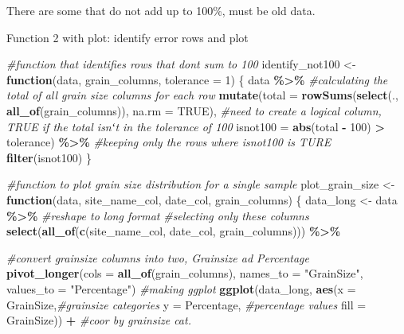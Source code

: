 \documentclass[
]{article}
\newenvironment{Shaded}{\begin{snugshade}}{\end{snugshade}}
\newcommand{\AttributeTok}[1]{\textcolor[rgb]{0.13,0.29,0.53}{#1}}
\newcommand{\CommentTok}[1]{\textcolor[rgb]{0.56,0.35,0.01}{\textit{#1}}}
\newcommand{\ConstantTok}[1]{\textcolor[rgb]{0.56,0.35,0.01}{#1}}
\newcommand{\ControlFlowTok}[1]{\textcolor[rgb]{0.13,0.29,0.53}{\textbf{#1}}}
\newcommand{\DecValTok}[1]{\textcolor[rgb]{0.00,0.00,0.81}{#1}}
\newcommand{\FunctionTok}[1]{\textcolor[rgb]{0.13,0.29,0.53}{\textbf{#1}}}
\newcommand{\NormalTok}[1]{#1}
\newcommand{\OtherTok}[1]{\textcolor[rgb]{0.56,0.35,0.01}{#1}}
\newcommand{\SpecialCharTok}[1]{\textcolor[rgb]{0.81,0.36,0.00}{\textbf{#1}}}
\newcommand{\StringTok}[1]{\textcolor[rgb]{0.31,0.60,0.02}{#1}}
\begin{document}
There are some that do not add up to 100\%, must be old data.

Function 2 with plot: identify error rows and plot

\begin{Shaded}
\begin{Highlighting}[]
\CommentTok{\#function that identifies rows that don\textquotesingle{}t sum to 100}
\NormalTok{identify\_not100 }\OtherTok{\textless{}{-}} \ControlFlowTok{function}\NormalTok{(data, grain\_columns, }\AttributeTok{tolerance =} \DecValTok{1}\NormalTok{) \{}
\NormalTok{  data }\SpecialCharTok{\%\textgreater{}\%}
    \CommentTok{\#calculating the total of all grain size columns for each row}
    \FunctionTok{mutate}\NormalTok{(}\AttributeTok{total =} \FunctionTok{rowSums}\NormalTok{(}\FunctionTok{select}\NormalTok{(., }\FunctionTok{all\_of}\NormalTok{(grain\_columns)), }\AttributeTok{na.rm =} \ConstantTok{TRUE}\NormalTok{),}
           \CommentTok{\#need to create a logical column, TRUE if the total isnʻt in the tolerance of 100}
           \AttributeTok{isnot100 =} \FunctionTok{abs}\NormalTok{(total }\SpecialCharTok{{-}} \DecValTok{100}\NormalTok{) }\SpecialCharTok{\textgreater{}}\NormalTok{ tolerance) }\SpecialCharTok{\%\textgreater{}\%}
    \CommentTok{\#keeping only the rows where isnot100 is TURE}
    \FunctionTok{filter}\NormalTok{(isnot100)}
\NormalTok{\}}

\CommentTok{\#function to plot grain size distribution for a single sample}
\NormalTok{plot\_grain\_size }\OtherTok{\textless{}{-}} \ControlFlowTok{function}\NormalTok{(data, site\_name\_col, date\_col, grain\_columns) \{}
\NormalTok{  data\_long }\OtherTok{\textless{}{-}}\NormalTok{ data }\SpecialCharTok{\%\textgreater{}\%}
    \CommentTok{\#reshape to long format }
    \CommentTok{\#selecting only these columns}
    \FunctionTok{select}\NormalTok{(}\FunctionTok{all\_of}\NormalTok{(}\FunctionTok{c}\NormalTok{(site\_name\_col, date\_col, grain\_columns))) }\SpecialCharTok{\%\textgreater{}\%}
   
    \CommentTok{\#convert grainsize columns into two, Grainsize ad Percentage}
     \FunctionTok{pivot\_longer}\NormalTok{(}\AttributeTok{cols =} \FunctionTok{all\_of}\NormalTok{(grain\_columns),}
                 \AttributeTok{names\_to =} \StringTok{"GrainSize"}\NormalTok{, }
                 \AttributeTok{values\_to =} \StringTok{"Percentage"}\NormalTok{)}
  \CommentTok{\#making ggplot }
  \FunctionTok{ggplot}\NormalTok{(data\_long, }
         \FunctionTok{aes}\NormalTok{(}\AttributeTok{x =}\NormalTok{ GrainSize,}\CommentTok{\#grainsize categories}
             \AttributeTok{y =}\NormalTok{ Percentage, }\CommentTok{\#percentage values}
             \AttributeTok{fill =}\NormalTok{ GrainSize)) }\SpecialCharTok{+} \CommentTok{\#coor by grainsize cat.}
    

\end{Highlighting}
\end{Shaded}
\end{document}
